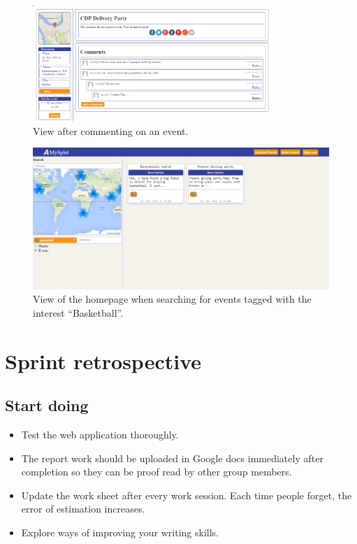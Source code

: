 \begin{figure}[ht!]
  \centering
  \includegraphics[width=90mm]{Sprint5/img/test6.png}
  \caption{View after commenting on an event. }
  \label{fig:S5TestAfterComment}
\end{figure}

\begin{figure}[ht!]
  \centering
  \includegraphics[width=\linewidth]{Sprint5/img/test7.png}
  \caption{View of the homepage when searching for events tagged with the interest ``Basketball''. }
  \label{fig:S5TestAfterComment}
\end{figure}

\newpage
\section{Sprint retrospective}
\label{sec:S5Retrospective}



\subsection{Start doing}
\label{subsec:S5RetrospectiveStart}

\begin{itemize}
  \item Test the web application thoroughly.
  \item The report work should be uploaded in Google docs immediately after completion so they can be proof read by other group members.
  \item Update the work sheet after every work session. Each time people forget, the error of estimation increases. 
  \item Explore ways of improving your writing skills. 
\end{itemize}


